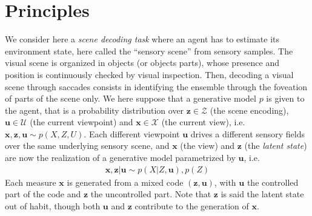 \documentclass{article}
\begin{document}
 \section{Principles}\label{sec:principles}
We consider here a \emph{scene decoding task} where an agent has to estimate its environment state, here called the ``sensory scene'' from sensory samples. The visual scene is organized in objects (or objects parts), whose presence and position is continuously checked by visual inspection. 
Then, decoding a visual scene through saccades consists in identifying the ensemble through the foveation of parts of the scene only. 
We here suppose that a generative model $p$ is given to the agent, that is a probability distribution over $\boldsymbol{z} \in \mathcal{Z}$ (the scene encoding),  $\boldsymbol{u} \in \mathcal{U}$ (the current viewpoint) and $\boldsymbol{x} \in \mathcal{X}$ (the current view), i.e. $\boldsymbol{x}, \boldsymbol{z}, \boldsymbol{u} \sim p(X,Z,U)$.
Each different viewpoint $\boldsymbol{u}$ drives a different sensory fields over the same underlying sensory scene, and $\boldsymbol{x}$ (the view) and $\boldsymbol{z}$ (the \emph{latent state}) are now the realization of a generative model parametrized by $\boldsymbol{u}$, i.e.
\begin{align}
\boldsymbol{x}, \boldsymbol{z} | \boldsymbol{u} \sim p(X|Z, \boldsymbol{u}), p(Z)
\end{align}  
Each measure $\boldsymbol{x}$ is generated from a mixed code $(\boldsymbol{z}, \boldsymbol{u})$, with $\boldsymbol{u}$ the controlled part of the code and  $\boldsymbol{z}$ the uncontrolled part. %
Note that $\boldsymbol{z}$ is said the latent state out of habit, though both $\boldsymbol{u}$ and $\boldsymbol{z}$ contribute to the generation of $\boldsymbol{x}$.
\end{document}
